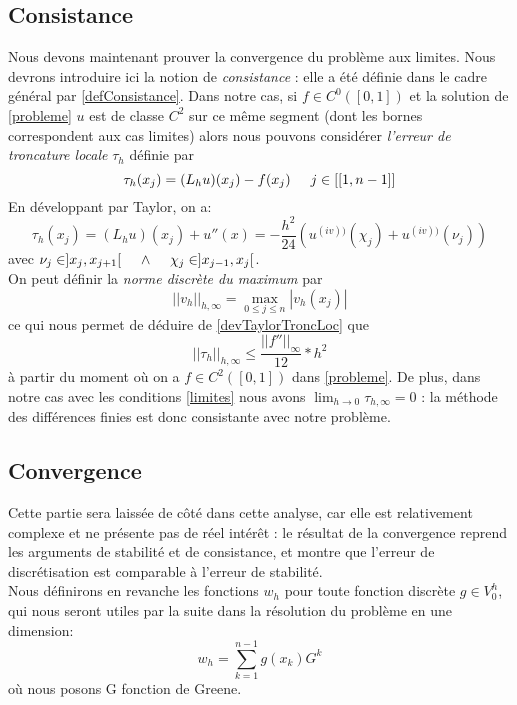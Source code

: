\documentclass[12pt]{article}
\newcommand{\espace}{\hspace{5mm}}
\begin{document}
\subsection{Consistance}
Nous devons maintenant prouver la convergence du problème aux limites. Nous devrons introduire ici la notion de \emph{consistance} : elle a été définie dans le cadre général par \eqref{defConsistance}. Dans notre cas, si $f \in C^0([0,1])$ et la solution de \eqref{probleme} $u$ est de classe $C^2$ sur ce même segment (dont les bornes correspondent aux cas limites) alors nous pouvons considérer \emph{l'erreur de troncature locale} $\tau_h$ définie par
\begin{equation}\label{erreurTroncatureLocale}
\tau_h(x_j) = (L_h u)(x_j) - f(x_j) \espace j \in [[1,n-1]]
\end{equation}
En développant par Taylor, on a:
\begin{equation}
\tau_h(x_j) = (L_h u)(x_j)  + u''(x) = -\frac{h^2}{24}(u^{(iv))} (\chi_j) + u^{(iv))} (\nu_j))
\end{equation} \label{devTaylorTroncLoc}
avec $\nu_j \in ]x_j, x_{j+1}[ \espace \wedge \espace \chi_j \in ]x_{j-1}, x_j[$.
\\ On peut définir la \emph{norme discrète du maximum} par
\begin{equation} \label{defNormeDiscreteDuMaximum}
|| v_h ||_{h, \infty}  = \max_{0 \le j \le n} |v_h(x_j)|
\end{equation}
ce qui nous permet de déduire de  \eqref{devTaylorTroncLoc} que
\begin{equation}
|| \tau_h ||_{h, \infty} \le \frac{||f''||_\infty}{12} * h^2
\end{equation}
à partir du moment où on a $f \in C^2([0,1])$ dans \eqref{probleme}. De plus, dans notre cas avec les conditions \eqref{limites} nous avons $\lim_{h \rightarrow 0} \tau_{h, \infty} = 0$ : la méthode des différences finies est donc consistante avec notre problème.

\subsection{Convergence}
Cette partie sera laissée de côté dans cette analyse, car elle est relativement complexe et ne présente pas de réel intérêt : le résultat de la convergence reprend les arguments de stabilité et de consistance, et montre que l'erreur de discrétisation est comparable à l'erreur de stabilité.\\
Nous définirons en revanche les fonctions $w_h$ pour toute fonction discrète $g \in V_0^h$, qui nous seront utiles par la suite dans la résolution du problème en une dimension:
\begin{equation} \label{defWK}
w_h = \sum_{k=1}^{n-1} g(x_k) G^k
\end{equation}
où nous posons G fonction de Greene.
\end{document}
